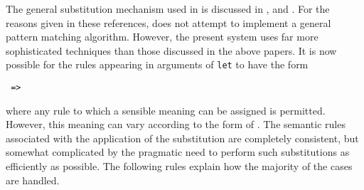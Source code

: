 The general substitution mechanism used in {\REDUCE} is discussed in
\cite{Hearn:68}, and \cite{Hearn:69a}. For the reasons given in these
references, {\REDUCE} does not attempt to implement a general pattern
matching algorithm.  However, the present system uses far more sophisticated
techniques than those discussed in the above papers.  It is now possible for
the rules appearing in arguments of \texttt{let} to have the form
\begin{syntax}
  \texttt{ => }
\end{syntax}
where any rule to which a sensible meaning can be assigned is permitted.
However, this meaning can vary according to the form of . The semantic rules associated with the application of the
substitution are completely consistent, but somewhat complicated by the
pragmatic need to perform such substitutions as efficiently as possible.
The following rules explain how the majority of the cases are handled.

